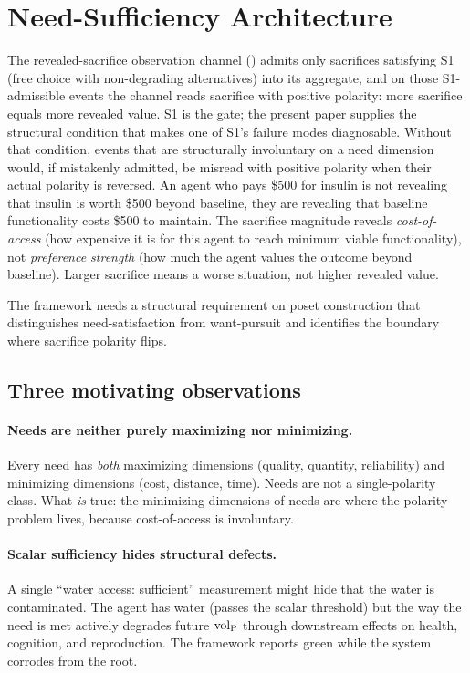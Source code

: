 \section{Need-Sufficiency Architecture}
\label{sec:need_sufficiency}

The revealed-sacrifice observation channel
(\citep[Revealed~Sacrifice]{lasser2026paper8a}) admits only
sacrifices satisfying S1 (free choice with non-degrading
alternatives) into its aggregate, and on those S1-admissible
events the channel reads sacrifice with positive polarity:
more sacrifice equals more revealed value.  S1 is the gate; the
present paper supplies the structural condition that makes one
of S1's failure modes diagnosable.  Without that condition,
events that are structurally involuntary on a need dimension
would, if mistakenly admitted, be misread with positive polarity
when their actual polarity is reversed.  An agent who pays \$500 for insulin is not revealing
that insulin is worth \$500 beyond baseline, they are revealing
that baseline functionality costs \$500 to maintain.  The sacrifice
magnitude reveals \emph{cost-of-access} (how expensive it is for
this agent to reach minimum viable functionality), not
\emph{preference strength} (how much the agent values the outcome
beyond baseline).  Larger sacrifice means a worse situation, not
higher revealed value.

The framework needs a structural requirement on poset
construction that distinguishes need-satisfaction from want-pursuit
and identifies the boundary where sacrifice polarity flips.

\subsection{Three motivating observations}

\paragraph{Needs are neither purely maximizing nor minimizing.}
Every need has \emph{both} maximizing dimensions (quality, quantity,
reliability) and minimizing dimensions (cost, distance, time). Needs are not a
single-polarity class. What \emph{is} true: the minimizing dimensions of needs
are where the polarity problem lives, because cost-of-access is involuntary.

\paragraph{Scalar sufficiency hides structural defects.}
A single ``water access: sufficient'' measurement might hide that the water is
contaminated.  The agent has water (passes the scalar threshold) but the way
the need is met actively degrades future ${\operatorname{vol}_{\mathrm{P}}}$ through downstream effects on
health, cognition, and reproduction.  The framework reports green while the
system corrodes from the root.

